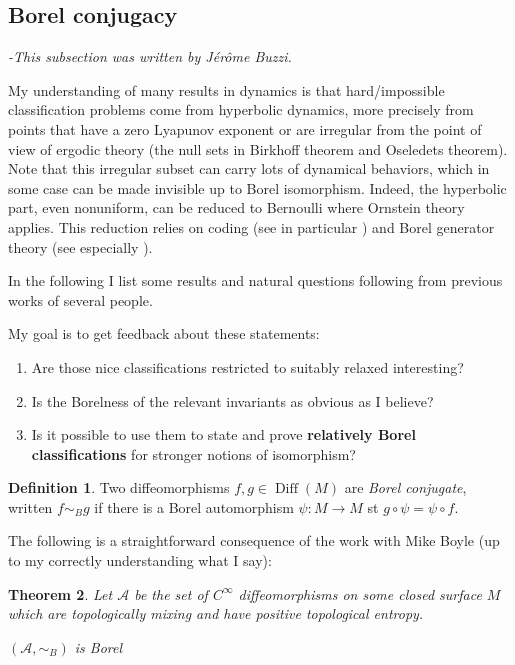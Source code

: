 \documentclass{article}
\newtheorem{theorem}{Theorem}[section]
\theoremstyle{definition}
\newtheorem{definition}[theorem]{Definition}
\begin{document}
\subsection{Borel conjugacy}
\textit{-This subsection was written by Jérôme Buzzi.} 

My understanding of many results in dynamics is that hard/impossible classification problems come from hyperbolic dynamics, more precisely from points that have a zero Lyapunov exponent or are irregular from the point of view of ergodic theory (the null sets in Birkhoff theorem and Oseledets theorem). 
Note that this irregular subset can carry lots of dynamical behaviors, which in some case can be made invisible up to Borel isomorphism. Indeed, the hyperbolic part, even nonuniform, can be reduced to Bernoulli where Ornstein theory applies. This reduction relies on coding (see in particular \cite{Sarig}) and Borel generator theory (see especially \cite{Hochman}).

In the following I list some results and natural questions following from previous works of several people. 

My goal is to get feedback about these statements:
 \begin{enumerate}
 \item Are those nice classifications restricted to suitably relaxed interesting?
 \item Is the Borelness of the relevant invariants as obvious as I believe?
 \item Is it possible to use them to state and prove {\bf relatively Borel classifications} for stronger notions of isomorphism?
\end{enumerate}    


\begin{definition}
Two diffeomorphisms $f,g\in\operatorname{Diff}(M)$ are \emph{Borel conjugate}, written $f\sim_B g$ if there is a Borel automorphism $\psi:M\to M$ st $g\circ\psi=\psi\circ f$.
\end{definition}

The following is a straightforward consequence of the work with Mike Boyle \cite{BB} (up to my correctly understanding what I say):

\begin{theorem}
Let $\mathscr A$ be the set of $C^\infty$ diffeomorphisms on some closed surface $M$ which are topologically mixing and have positive topological entropy.

$(\mathscr A,\sim_B)$ is Borel
\end{theorem}
\end{document}
